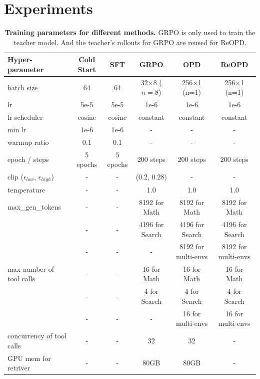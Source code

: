 \section{Experiments}
\label{sec:experiments}

\begin{table}[t]
    \caption{\textbf{Training parameters for different methods.} GRPO is only used to train the teacher model. And the teacher's rollouts for GRPO are reused for ReOPD.}
    \label{tab:training_hyperparams}
    \footnotesize
    \centering
    \begin{tabular}{lccccc}
        \toprule
        \textbf{Hyper-parameter} & \textbf{Cold Start} & \textbf{SFT} & \textbf{GRPO} & \textbf{OPD} & \textbf{ReOPD} \\
        \midrule
        batch size & 64 & 64 & 32$\times$8 ($n=8$) & 256$\times$1 (n=1) & 256$\times$1 (n=1) \\
        lr & 5e-5 & 5e-5 & 1e-6 & 1e-6 & 1e-6 \\
        lr scheduler & cosine &  cosine & constant & constant & constant   \\
        min lr & 1e-6 & 1e-6 &  - & - & - \\
        warmup ratio & 0.1 & 0.1 & - & - & - \\
        epoch / steps & 5 epochs & 5 epochs & 200 steps & 200 steps & 200 steps \\
        clip ($\epsilon_{low}$, $\epsilon_{high}$) & - & - & (0.2, 0.28) & - & - \\
        temperature & - & - & 1.0 & 1.0 & 1.0 \\
        max\_gen\_tokens & - & - & 8192 for Math & 8192 for Math & 8192 for Math \\
        & - & - & 4196 for Search & 4196 for Search & 4196 for Search \\
        & - & - & - & 8192 for multi-envs & 8192 for multi-envs \\
        max number of tool calls & - & - & 16 for Math & 16 for Math & 16 for Math \\
        & - & - & 4 for Search & 4 for Search & 4 for Search \\
        & - & - & - & 16 for multi-envs & 16 for multi-envs \\
        concurrency of tool calls & - & - & 32 & 32 & - \\
        GPU mem for retriver & - & - & 80GB & 80GB & - \\
        \bottomrule
    \end{tabular}
\end{table}


